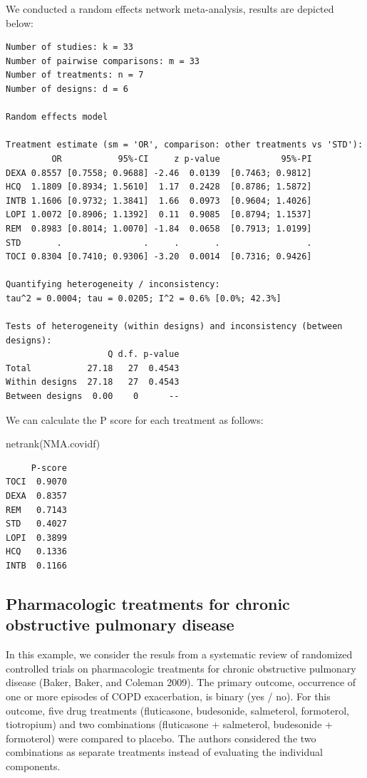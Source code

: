 \documentclass[
  letterpaper,
  DIV=11,
  numbers=noendperiod]{scrreprt}
\newenvironment{Shaded}{\begin{snugshade}}{\end{snugshade}}
\newcommand{\FunctionTok}[1]{\textcolor[rgb]{0.28,0.35,0.67}{#1}}
\newcommand{\NormalTok}[1]{\textcolor[rgb]{0.00,0.23,0.31}{#1}}
\begin{document}
We conducted a random effects network meta-analysis, results are
depicted below:

\begin{verbatim}
Number of studies: k = 33
Number of pairwise comparisons: m = 33
Number of treatments: n = 7
Number of designs: d = 6

Random effects model

Treatment estimate (sm = 'OR', comparison: other treatments vs 'STD'):
         OR           95%-CI     z p-value            95%-PI
DEXA 0.8557 [0.7558; 0.9688] -2.46  0.0139  [0.7463; 0.9812]
HCQ  1.1809 [0.8934; 1.5610]  1.17  0.2428  [0.8786; 1.5872]
INTB 1.1606 [0.9732; 1.3841]  1.66  0.0973  [0.9604; 1.4026]
LOPI 1.0072 [0.8906; 1.1392]  0.11  0.9085  [0.8794; 1.1537]
REM  0.8983 [0.8014; 1.0070] -1.84  0.0658  [0.7913; 1.0199]
STD       .                .     .       .                 .
TOCI 0.8304 [0.7410; 0.9306] -3.20  0.0014  [0.7316; 0.9426]

Quantifying heterogeneity / inconsistency:
tau^2 = 0.0004; tau = 0.0205; I^2 = 0.6% [0.0%; 42.3%]

Tests of heterogeneity (within designs) and inconsistency (between designs):
                    Q d.f. p-value
Total           27.18   27  0.4543
Within designs  27.18   27  0.4543
Between designs  0.00    0      --
\end{verbatim}

We can calculate the P score for each treatment as follows:

\begin{Shaded}
\begin{Highlighting}[]
\FunctionTok{netrank}\NormalTok{(NMA.covidf)}
\end{Highlighting}
\end{Shaded}

\begin{verbatim}
     P-score
TOCI  0.9070
DEXA  0.8357
REM   0.7143
STD   0.4027
LOPI  0.3899
HCQ   0.1336
INTB  0.1166
\end{verbatim}

\hypertarget{pharmacologic-treatments-for-chronic-obstructive-pulmonary-disease}{%
\subsection{Pharmacologic treatments for chronic obstructive pulmonary
disease}\label{pharmacologic-treatments-for-chronic-obstructive-pulmonary-disease}}

In this example, we consider the resuls from a systematic review of
randomized controlled trials on pharmacologic treatments for chronic
obstructive pulmonary disease (Baker, Baker, and Coleman 2009). The
primary outcome, occurrence of one or more episodes of COPD
exacerbation, is binary (yes / no). For this outcome, five drug
treatments (fluticasone, budesonide, salmeterol, formoterol, tiotropium)
and two combinations (fluticasone + salmeterol, budesonide + formoterol)
were compared to placebo. The authors considered the two combinations as
separate treatments instead of evaluating the individual components.
\end{document}
